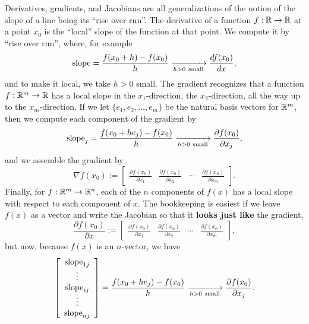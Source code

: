 \begin{tcolorbox}[sharp corners, colback=green!30, colframe=green!80!blue,title={\textbf{From slopes of lines}$\to$\textbf{slopes of functions at points}~$\mathbf{\to \frac{df(x_0)}{dx} \to \nabla f(x_0) \to \frac{\partial f(x_0)}{\partial x}}$}]
Derivatives, gradients, and Jacobians are all generalizations of the notion of the slope  of a line being its ``rise over run''. The derivative of a function $f:\mathbb R \to \mathbb R$ at a point $x_0$ is the ``local'' slope of the function at that point. We compute it by ``rise over run'', where, for example
\begin{equation}
    \label{eq:SummaryDerivative}
 \text{\rm slope} = \frac{f(x_0+h)-f(x_0)}{h} \xrightarrow[h>0~\text{small}]{} \frac{df(x_0)}{dx},
\end{equation}
and to make it local, we take $h>0$ small. The gradient recognizes that a function $f:\mathbb R^m \to \mathbb R$ has a local slope in the $x_1$-direction, the $x_2$-direction, all the way up to the $x_m$-direction. If we let $\{e_1, e_2, \ldots, e_m \}$ be the natural basis vectors for $\mathbb R^m$, then we compute each component of the gradient by 
\begin{equation}
    \label{eq:SummaryGradient01}
    \text{\rm slope}_j = \frac{f(x_0+h e_j)-f(x_0)}{h}  \xrightarrow[h>0~\text{small}]{} \frac{\partial f(x_0)}{\partial x_j}, 
    \end{equation}
and we assemble the gradient by 
\begin{equation}
    \label{eq:SummaryGradient02}
\nabla f(x_0):= \left[\begin{array}{cccc} \frac{\partial f(x_0)}{\partial x_1} & \frac{\partial f(x_0)}{\partial x_2} & \cdots & \frac{\partial f(x_0)}{\partial x_m}
\end{array} \right]. 
\end{equation}
Finally, for $f:\mathbb R^m \to \mathbb R^n$, each of the $n$ components of $f(x)$ has a local slope with respect to each component of $x$. The bookkeeping is easiest if we leave $f(x)$ as a vector and write the Jacobian so that it \textbf{looks just like} the gradient,  
\begin{equation}
    \label{eq:SummaryJacobian01}
    \frac{ \partial f(x_0) }{\partial x}:= \left[\begin{array}{cccc} \frac{\partial f(x_0)}{\partial x_1} & \frac{\partial f(x_0)}{\partial x_2} & \cdots & \frac{\partial f(x_0)}{\partial x_m}
\end{array} \right],  
\end{equation}
but now, because $f(x)$ is an $n$-vector, we have 
\begin{equation}
    \label{eq:SummaryJacobian02}
    \left[\begin{array}{c}  \text{\rm slope}_{1j}\\ \vdots \\ \text{\rm slope}_{ij} \\ \vdots \\ \text{\rm slope}_{nj} \end{array}  \right] = \frac{f(x_0+h e_j)-f(x_0)}{h}  \xrightarrow[h>0~\text{small}]{} \frac{\partial f(x_0)}{\partial x_j}. 
\end{equation}
\end{tcolorbox}

